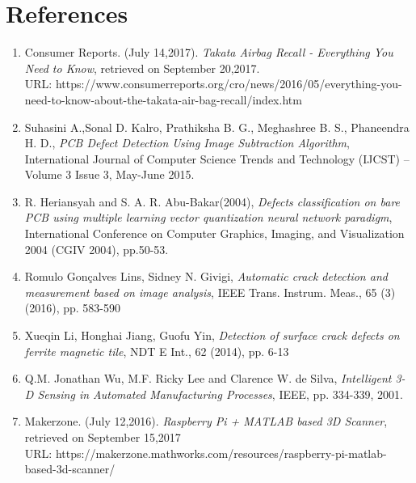 \documentclass[12pt]{article}
\begin{document}
\section{References}
\begin{enumerate}
\item{Consumer Reports. (July 14,2017). \emph{Takata Airbag Recall - Everything You Need to Know}, retrieved on September 20,2017.\\
URL: https://www.consumerreports.org/cro/news/2016/05/everything-you-need-to-know-about-the-takata-air-bag-recall/index.htm}
\item{
Suhasini A.,Sonal D. Kalro, Prathiksha B. G., Meghashree B. S., Phaneendra H. D., \emph{PCB Defect Detection Using Image Subtraction Algorithm}, International Journal of Computer Science Trends and Technology (IJCST) – Volume 3 Issue 3, May-June 2015.
}
\item{R. Heriansyah and S. A. R. Abu-Bakar(2004), \emph{Defects classification on bare PCB using multiple learning vector quantization neural network paradigm}, International Conference on Computer Graphics, Imaging, and Visualization 2004 (CGIV 2004), pp.50-53.}
\item{
Romulo Gonçalves Lins, Sidney N. Givigi, \emph{Automatic crack detection and
measurement based on image analysis}, IEEE Trans. Instrum. Meas., 65 (3) (2016), pp. 583-590}
\item{Xueqin Li, Honghai Jiang, Guofu Yin, \emph{Detection of surface crack defects on ferrite magnetic tile}, NDT E Int., 62 (2014), pp. 6-13}
\item{Q.M. Jonathan Wu, M.F. Ricky Lee and Clarence W. de Silva,
\emph{Intelligent 3-D Sensing in Automated Manufacturing Processes}, IEEE, pp. 334-339, 2001.}
\item{Makerzone. (July 12,2016). \emph{Raspberry Pi + MATLAB based 3D Scanner}, retrieved on September 15,2017\\
URL: https://makerzone.mathworks.com/resources/raspberry-pi-matlab-based-3d-scanner/}
\end{enumerate}
\end{document}
